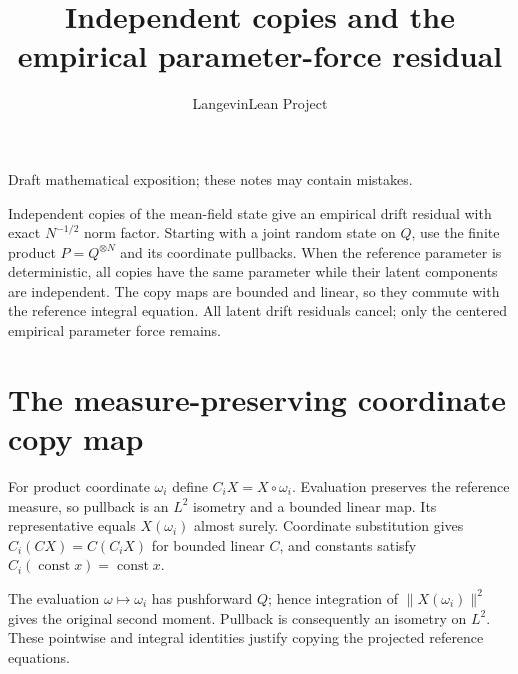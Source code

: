 \documentclass[11pt,a4paper]{article}
\title{\texorpdfstring{Independent copies and the empirical parameter-force residual}{Independent copies and the empirical parameter-force residual}}
\author{LangevinLean Project}
\date{}
\begin{document}
\maketitle
Draft mathematical exposition; these notes may contain mistakes.


Independent copies of the mean-field state give an empirical drift residual with exact \(N^{-1/2}\) norm factor. Starting with a joint random state on \(Q\), use the finite product \(P=Q^{\otimes N}\) and its coordinate pullbacks. When the reference parameter is deterministic, all copies have the same parameter while their latent components are independent. The copy maps are bounded and linear, so they commute with the reference integral equation. All latent drift residuals cancel; only the centered empirical parameter force remains.


\section{\texorpdfstring{The measure-preserving coordinate copy map}{The measure-preserving coordinate copy map}}


For product coordinate \(\omega_i\) define \(C_iX=X\circ\omega_i\). Evaluation preserves the reference measure, so pullback is an \(L^2\) isometry and a bounded linear map. Its representative equals \(X(\omega_i)\) almost surely. Coordinate substitution gives \(C_i(CX)=C(C_iX)\) for bounded linear \(C\), and constants satisfy \(C_i(\operatorname{const}x)=\operatorname{const}x\).



The evaluation \(\omega\mapsto\omega_i\) has pushforward \(Q\); hence integration of \(\|X(\omega_i)\|^2\) gives the original second moment. Pullback is consequently an isometry on \(L^2\). These pointwise and integral identities justify copying the projected reference equations.
\end{document}
